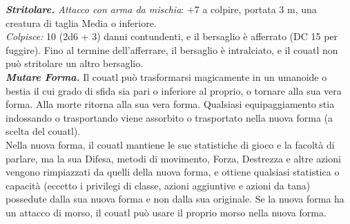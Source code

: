 \begin{multicols}{2}
\emph{\textbf{Stritolare.} Attacco con arma da mischia}: +7 a colpire, portata 3 m, una creatura di taglia Media o inferiore.\\
\emph{Colpisce:} 10 (2d6 + 3) danni contundenti, e il bersaglio è afferrato (DC 15 per fuggire). Fino al termine dell'afferrare, il bersaglio è intralciato, e il couatl non può stritolare un altro bersaglio.\\
\emph{\textbf{Mutare Forma.}} Il couatl può trasformarsi magicamente in un umanoide o bestia il cui grado di sfida sia pari o inferiore al proprio, o tornare alla sua vera forma. Alla morte ritorna alla sua vera forma. Qualsiasi equipaggiamento stia indossando o trasportando viene assorbito o trasportato nella nuova forma (a scelta del couatl).\\
Nella nuova forma, il couatl mantiene le sue statistiche di gioco e la facoltà di parlare, ma la sua Difesa, metodi di movimento, Forza, Destrezza e altre azioni vengono rimpiazzati da quelli della nuova forma, e ottiene qualsiasi statistica o capacità (eccetto i privilegi di classe, azioni aggiuntive e azioni da tana) possedute dalla sua nuova forma e non dalla sua originale. Se la nuova forma ha un attacco di morso, il couatl può usare il proprio morso nella nuova forma.\\


\end{multicols}
